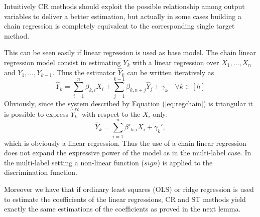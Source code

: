 \documentclass[11pt,a4paper, twoside]{book}
\begin{document}
Intuitively CR methods should exploit the possible relationship among output variables to deliver a better estimation, but actually in some cases building a chain regression  is completely equivalent to the corresponding single target method.

This can be seen easily if linear regression is used as base model.
The chain linear regression model consist in estimating ${Y}_k$ with a linear regression over $X_1,\ldots,X_n$ and $Y_1,\ldots,Y_{k-1}$. Thus the estimator $\hat{Y}_k$ can be written iteratively as
\begin{equation}
\label{eq:regchain}
 \hat{Y}_k = \sum_{i=1}^{n} \beta_{k,i} X_i + \sum_{j=1}^{k-1} \beta_{k,n+j} \hat{Y}_j  + \gamma_{k}  \quad \forall k \in [h]
\end{equation}
Obviously, since the system described by Equation (\ref{eq:regchain}) is triangular it is possible to express $\hat{Y}^{rc}_{k}$ with respect to the $X_i$ only:
$$
\hat{Y}_k = \sum_{i=1}^{n} \beta'_{k,i} X_i + \gamma_{k}',
$$
which is obviously a  linear regression. Thus the use of a chain linear regression does not expand the expressive power of the model as in the multi-label case. In the multi-label setting a non-linear function ($sign$) is applied to the discrimination function. 

Moreover we have that if ordinary least squares (OLS) or ridge regression \citep{hoerl1970} is used to estimate the coefficients of the linear regressions, CR and ST methods yield exactly the same estimations of the coefficients as proved in the next lemma.
\end{document}
